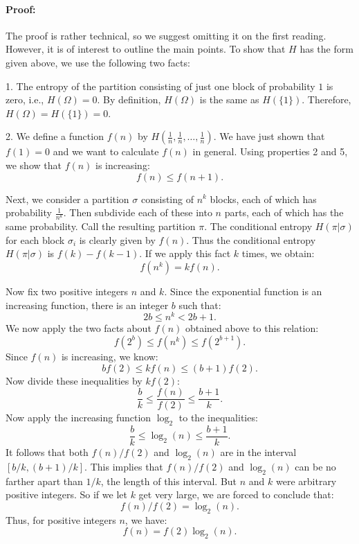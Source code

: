 \documentclass{report}
\begin{document}
\paragraph{Proof:} 
The proof is rather technical, so we suggest omitting it on the first reading. However, it is of interest to outline the main points. To show that \( H \) has the form given above, we use the following two facts:

1. The entropy of the partition consisting of just one block of probability \( 1 \) is zero, i.e., \( H(\Omega) = 0 \). By definition, \( H(\Omega) \) is the same as \( H(\{1\}) \). Therefore, \( H(\Omega) = H(\{1\}) = 0 \).

2. We define a function \( f(n) \) by \( H\left(\frac{1}{n}, \frac{1}{n}, \ldots, \frac{1}{n}\right) \). We have just shown that \( f(1) = 0 \) and we want to calculate \( f(n) \) in general. Using properties 2 and 5, we show that \( f(n) \) is increasing:
\[
f(n) \leq f(n+1).
\]

Next, we consider a partition \( \sigma \) consisting of \( n^k \) blocks, each of which has probability \( \frac{1}{n^k} \). Then subdivide each of these into \( n \) parts, each of which has the same probability. Call the resulting partition \( \pi \). The conditional entropy \( H(\pi|\sigma) \) for each block \( \sigma_i \) is clearly given by \( f(n) \). Thus the conditional entropy \( H(\pi|\sigma) \) is \( f(k) - f(k-1) \). If we apply this fact \( k \) times, we obtain:
\[
f(n^k) = k f(n).
\]

Now fix two positive integers \( n \) and \( k \). Since the exponential function is an increasing function, there is an integer \( b \) such that:
\[
2b \leq n^k < 2b+1.
\]
We now apply the two facts about \( f(n) \) obtained above to this relation:
\[
f(2^b) \leq f(n^k) \leq f(2^{b+1}).
\]
Since \( f(n) \) is increasing, we know:
\[
b f(2) \leq k f(n) \leq (b+1)f(2).
\]
Now divide these inequalities by \( k f(2) \):
\[
\frac{b}{k} \leq \frac{f(n)}{f(2)} \leq \frac{b+1}{k}.
\]
Now apply the increasing function \( \log_2 \) to the inequalities:
\[
\frac{b}{k} \leq \log_2(n) \leq \frac{b+1}{k}.
\]
It follows that both \( f(n)/f(2) \) and \( \log_2(n) \) are in the interval \( [b/k, (b+1)/k] \). This implies that \( f(n)/f(2) \) and \( \log_2(n) \) can be no farther apart than \( 1/k \), the length of this interval. But \( n \) and \( k \) were arbitrary positive integers. So if we let \( k \) get very large, we are forced to conclude that:
\[
f(n)/f(2) = \log_2(n).
\]
Thus, for positive integers \( n \), we have:
\[
f(n) = f(2) \log_2(n).
\]
\end{document}
